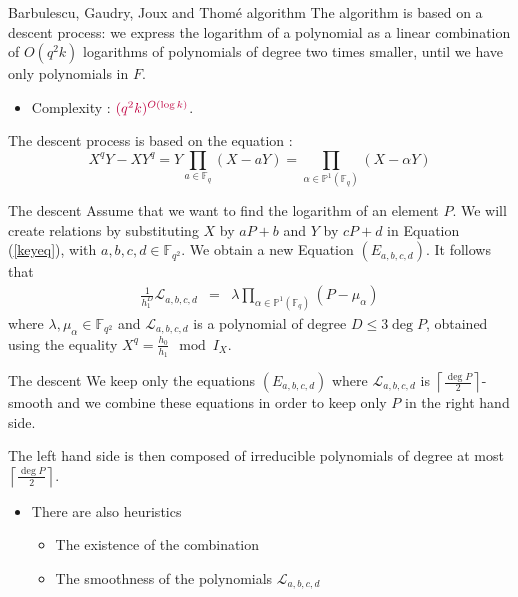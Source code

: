 \documentclass[xcolor=x11names,compress]{beamer}
\theoremstyle{break}
\theoremstyle{sc}
\theoremstyle{definition}
\theoremstyle{remark}
\begin{document}
\begin{frame}{Barbulescu, Gaudry, Joux and Thomé algorithm}
The algorithm is based on a descent process: we express the logarithm of a
polynomial as a linear combination of $O(q^2k)$ logarithms of polynomials of degree two
times smaller, until we have only polynomials in $F$.
    \begin{itemize}
      \item Complexity : $\textcolor{purple}{(q^2k)^{O(\log k)}}$.
    \end{itemize}
    The descent process is based on the equation :
 \begin{equation}
   X^qY - XY^q = Y\prod_{a\in\mathbb{F}_q}(X - aY) =
   \prod_{\alpha\in\mathbb{P}^1(\mathbb{F}_q)}(X-\alpha Y)
   \label{keyeq}
 \end{equation}
 
\end{frame}

\begin{frame}{The descent}
  Assume that we want to find the logarithm of an element $P$. We will create
  relations by substituting $X$ by $aP + b$ and $Y$ by $cP + d$ in Equation
  (\ref{keyeq}), with $a, b, c, d \in \mathbb{F}_{q^2}$. We obtain a new
  Equation $(E_{a, b, c, d})$. It follows that
  \begin{eqnarray*}
    \frac{1}{h_1^D}\mathcal L_{a, b, c, d} &=& \lambda
    \prod_{\alpha\in\mathbb{P}^1(\mathbb{F}_q)}(P-\mu_\alpha)
  \end{eqnarray*}
  where $\lambda, \mu_\alpha\in\mathbb{F}_{q^2}$ and $\mathcal L_{a, b, c,
  d}$ is a polynomial of degree $D\leq 3\deg P$, obtained using the equality $X^q =
  \frac{h_0}{h_1}\mod I_X$.
  
\end{frame}

\begin{frame}{The descent}
  We keep only the equations $(E_{a, b, c, d})$ where
  $\mathcal L_{a, b, c, d}$ is
  $\left\lceil \frac{\deg P}{2}\right\rceil$-smooth and we combine these equations
  in order to keep only $P$ in the right hand side.

  The left hand side is then composed of irreducible polynomials 
  of degree at most $\left\lceil \frac{\deg P}{2}\right\rceil$.

  \begin{itemize}
    \item There are also heuristics
      \begin{itemize}
        \item The existence of the combination
        \item The smoothness of the polynomials $\mathcal L_{a, b, c, d}$
      \end{itemize}
  \end{itemize}
\end{frame}
\end{document}
